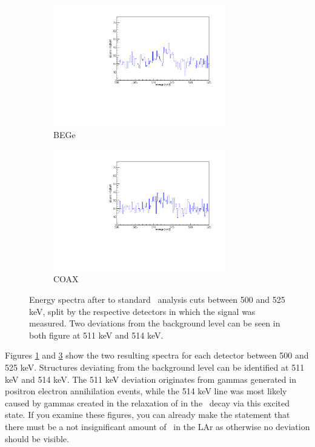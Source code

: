 \documentclass[encoding=utf8,british]{tumphthesis}
\begin{document}
\begin{figure}[t!]
\centering
\begin{subfigure}{.475\textwidth}
  \centering
	\includegraphics[width=75mm]{./Bilder/500525NoFilterBEGes.pdf}

  \caption{BEGe}
    \label{fig:NoFilterBEGes}
\end{subfigure}\hfill%
\begin{subfigure}{.475\textwidth}
  \centering
	\includegraphics[width=75mm]{./Bilder/500525NoFilterCOAX.pdf}
  \caption{COAX}
  \label{fig:NoFilterCOAX}
\end{subfigure}
	\caption{
	Energy spectra after to standard \gerda\ analysis cuts between 500 and 525 keV, split by the respective detectors in which the signal was measured.
	Two deviations from the background level can be seen in both figure at 511 keV and 514 keV.
	}
			\vspace{5mm}
\end{figure}

Figures \ref{fig:NoFilterBEGes} and \ref{fig:NoFilterCOAX} show the two resulting spectra for each detector between 500 and 525 keV.
Structures deviating from the background level can be identified  at 511 keV and 514 keV.
The 511 keV deviation originates from gammas generated in positron electron annihilation events, while the 514 keV line was most likely caused by gammas created in the relaxation of  in the \Kr\ decay via this excited state.
If you examine these figures, you can already make the statement that there must be a not insignificant amount of \Kr\ in the LAr as otherwise no deviation should be visible.
\\
\end{document}
